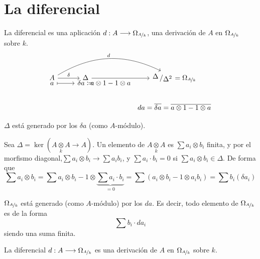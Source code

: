 \section{La diferencial}
\begin{defi}
    La diferencial es una aplicaci\'on $d: A \longrightarrow \Omega_{\nicefrac{A}{k}}$, una derivaci\'on de $A$ en $\Omega_{\nicefrac{A}{k}}$ sobre $k$. 
    $$\bt A \arrow[bend left=10mm]{rrr}{d} \rar{\delta} & \Delta\arrow{rr} &[-13mm] &[-8mm]  \modulo{\Delta}{\Delta^2} = \Omega_{\nicefrac{A}{k}} \\[-10mm] a \rarmaps &[-13mm] \delta a \coloneq &[-8mm] a\otimes 1 - 1 \otimes a \\ & &[-18mm] &[-8mm]  da = \overline{\delta a} = \overline{a\otimes 1 - 1 \otimes a}\et$$
\end{defi}
\begin{prop}
    $\Delta$ est\'a generado por los $\delta a$ (como $A$-m\'odulo). 
\end{prop}
\begin{dem}
    Sea $\Delta = \ker(A \underset{k}{\otimes} A \to A)$. Un elemento de $A \underset{k}{\otimes} A$ es $\sum a_i \otimes b_i$ finita, y por el morfismo diagonal,$\sum a_i \otimes b_i \longrightarrow \sum a_i b_i$, y $\sum a_i \cdot  b_i = 0$ si $\sum a_i \otimes b_i \in \Delta$. De forma que
    $$\sum a_i \otimes b_i = \sum a_i \otimes b_i- 1\otimes \underbrace{\sum a_i \cdot b_i}_{=0} = \sum (a_i \otimes b_i - 1\otimes a_i b_i) = \sum b_i (\delta a_i)$$
\end{dem}
\begin{cor}
    $\Omega_{\nicefrac{A}{k}}$ est\'a generado (como $A$-m\'odulo) por los $da$. Es decir, todo elemento de $\Omega_{\nicefrac{A}{k}}$ es de la forma
    $$\sum b_i \cdot da_i$$
    siendo una suma finita. 
\end{cor}
\begin{prop}
    La diferencial $d: A \longrightarrow \Omega_{\nicefrac{A}{k}}$ es una derivaci\'on de $A$ en $\Omega_{\nicefrac{A}{k}}$ sobre $k$.
\end{prop}
